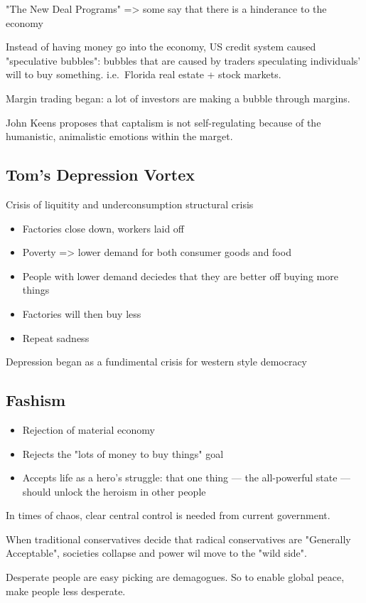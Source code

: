\documentclass[letterpaper]{article}
\begin{document}
"The New Deal Programs" => some say that there is a hinderance to the
economy

Instead of having money go into the economy, US credit system caused
"speculative bubbles": bubbles that are caused by traders speculating
individuals' will to buy something. i.e. Florida real estate + stock
markets.

Margin trading began: a lot of investors are making a bubble through
margins.

John Keens proposes that captalism is not self-regulating because of the
humanistic, animalistic emotions within the marget.

\subsection{Tom's Depression Vortex}
\label{sec:org6427348}
Crisis of liquitity and underconsumption structural crisis

\begin{itemize}
\item Factories close down, workers laid off
\item Poverty => lower demand for both consumer goods and food
\item People with lower demand deciedes that they are better off buying more
things
\item Factories will then buy less
\item Repeat sadness
\end{itemize}

Depression began as a fundimental crisis for western style democracy

\subsection{Fashism}
\label{sec:org25307db}
\begin{itemize}
\item Rejection of material economy
\item Rejects the "lots of money to buy things" goal
\item Accepts life as a hero's struggle: that one thing --- the all-powerful
state --- should unlock the heroism in other people
\end{itemize}

In times of chaos, clear central control is needed from current
government.

When traditional conservatives decide that radical conservatives are
"Generally Acceptable", societies collapse and power wil move to the
"wild side".

Desperate people are easy picking are demagogues. So to enable global
peace, make people less desperate.
\end{document}
